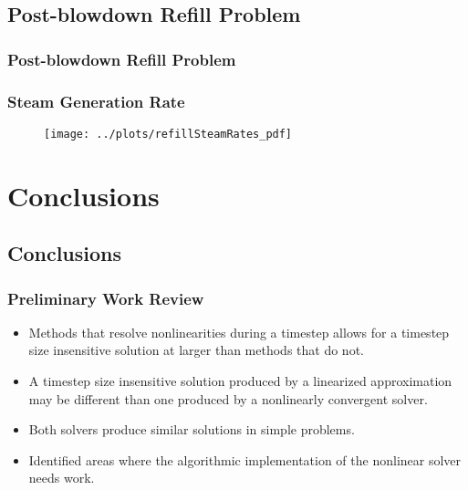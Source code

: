 \documentclass[compress,xcolor=table]{beamer}
\begin{document}
\subsection[Post-blowdown Refill Problem]{Post-blowdown Refill Problem}
\begin{frame}
\frametitle{Post-blowdown Refill Problem}

\begin{figure}[h!t]
\centering
\resizebox{!}{0.6\textheight}{}
\end{figure}
\end{frame}
\begin{frame}
\frametitle{Steam Generation Rate}

\begin{figure}[h!t]
\centering
\texttt{[image: ../plots/refillSteamRates\_pdf]}
\end{figure}

\end{frame}

\section[Conclusions]{Conclusions}
\subsection[Conclusions]{Conclusions}
\begin{frame}
\frametitle{Preliminary Work Review}

\begin{itemize}
\item{Methods that resolve nonlinearities during a timestep allows for a timestep size insensitive solution at larger \dtmax{} than methods that do not.}
\item{A timestep size insensitive solution produced by a linearized approximation may be different than one produced by a nonlinearly convergent solver.}
\item{Both solvers produce similar solutions in simple problems.}
\item{Identified areas where the algorithmic implementation of the nonlinear solver needs work.}
\end{itemize}

\end{frame}
\end{document}

